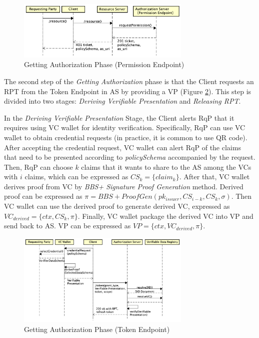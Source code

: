 \documentclass[conference, dvipdfmx]{IEEEtran} %
\begin{document}
\begin{sloppypar}
\begin{figure}[htbp] %
  \begin{center} %
  \includegraphics[width=83mm]{images/GetAuthorization_Permission_Endpoint.png} %
  \caption{Getting Authorization Phase (Permission Endpoint)} %
  \label{fig:GetAuthorization_Permission_Endpoint} %
  \end{center}
\end{figure}

The second step of the \textit{Getting Authorization} phase is that the Client requests an RPT from the Token Endpoint in AS by providing a VP (Figure \ref{fig:GetAuthorization_Token_Endpoint}). This step is divided into two stages: \textit{Deriving Verifiable Presentation} and \textit{Releasing RPT}.

In the \textit{Deriving Verifiable Presentation} Stage, the Client alerts RqP that it requires using VC wallet for identity verification. Specifically, RqP can use VC wallet to obtain credential requests (in practice, it is common to use QR code). After accepting the credential request,  VC wallet can alert RqP of the claims that need to be presented according to \textit{policySchema} accompanied by the request.
Then, RqP can choose $k$ claims that it wants to share to the AS  among the VCs with $i$ claims, which can be expressed as $CS_k = \{claim_k\}$. 
After that, VC wallet derives proof from VC by \textit{BBS+ Signature Proof Generation} method. Derived proof can be expressed as $\pi = BBS+ ProofGen(pk_{issuer}, CS_{i-k}, CS_k, \sigma)$. Then VC wallet can use the derived proof to generate derived VC, expressed as $VC_{derived} = \{ctx, CS_k, \pi\}$. Finally, VC wallet package the derived VC into VP and send back to AS. VP can be expressed as $VP=\{ctx, VC_{derived}, \pi\}$.

\begin{figure}[htbp] %
  \begin{center} %
  \includegraphics[width=83mm]{images/GetAuthorization_Token_Endpoint.png} %
  \caption{Getting Authorization Phase (Token Endpoint)} %
  \label{fig:GetAuthorization_Token_Endpoint} %
  \end{center}
\end{figure}


\end{sloppypar}
\end{document}
